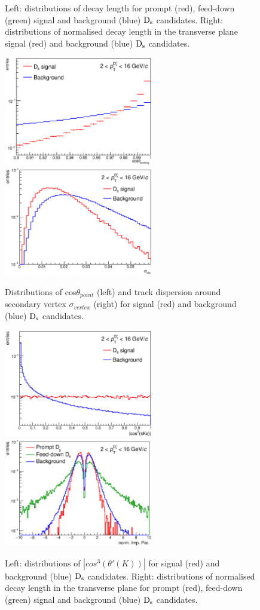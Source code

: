 \begin{itemize}
\begin{figure}[!t]
\caption{Left: distributions of decay length for prompt (red), feed-down (green) signal and background (blue) ${\rm D_s}$ candidates. Right: distributions of normalised decay length in the transverse plane signal (red) and background (blue) ${\rm D_s}$ candidates.}
\label{fig:var1}
\end{figure}
\begin{figure}[!h]
\centering
\includegraphics[width=6.5cm]{FigCap4/cosP.eps}
\includegraphics[width=6.5cm]{FigCap4/sigVert.eps}
\caption{Distributions of cos$\theta_{point}$ (left) and track dispersion around secondary vertex $\sigma_{vertex}$ (right) for signal (red) and background (blue) ${\rm D_s}$ candidates.}
\label{fig:var2}
\end{figure}
\begin{figure}[!h]
\centering
\includegraphics[width=6.5cm]{FigCap4/CosPiKPhi3.eps}
\includegraphics[width=6.5cm]{FigCap4/normIP.eps}
\caption{Left: distributions of $|cos^3(\theta'(K))|$ for signal (red) and background (blue) ${\rm D_s}$ candidates. Right: distributions of normalised decay length in the transverse plane for prompt (red), feed-down (green) signal and background (blue) ${\rm D_s}$ candidates.}
\label{fig:var3}
\end{figure}


\end{itemize}
